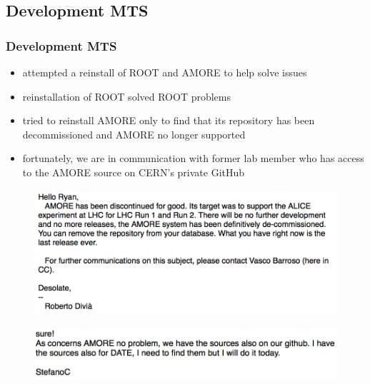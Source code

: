\documentclass[aspectratio=169]{beamer}
\begin{document}


\subsection{Development MTS}

\begin{frame}

  \frametitle{Development MTS}

  \begin{itemize}
    \item attempted a reinstall of ROOT and AMORE to help solve issues
    \item reinstallation of ROOT solved ROOT problems
    \item tried to reinstall AMORE only to find that its repository has been
      decommissioned and AMORE no longer supported
    \item fortunately, we are in communication with former lab member who has
      access to the AMORE source on CERN's private GitHub
  \end{itemize}

  \begin{multicols}{2}
    
    \begin{figure}[H]
      \begin{center}
        \includegraphics[scale=0.4]{AMOREGoneEmail.png}
      \end{center}
    \end{figure}
    
    \columnbreak

    \begin{figure}[H]
      \begin{center}
        \includegraphics[scale=0.4]{StefanoEmail.png}
      \end{center}
    \end{figure}

  \end{multicols}

\end{frame}
\end{document}
